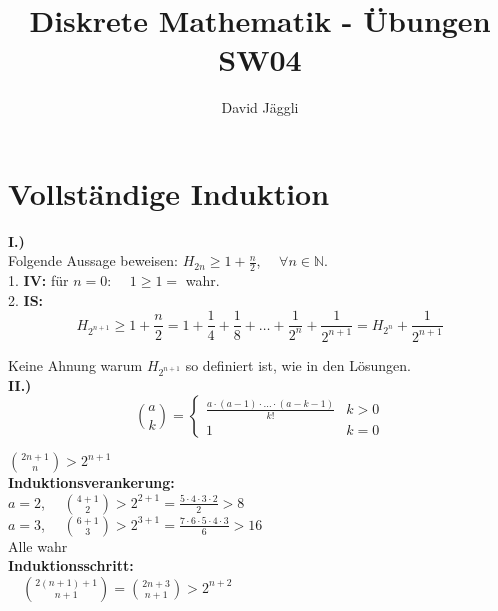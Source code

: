 \documentclass[12pt]{scrartcl}
\author{David Jäggli}
\title{Diskrete Mathematik - Übungen SW04}
\begin{document}
\maketitle

\tableofcontents

\newpage
\section{Vollständige Induktion}
\textbf{I.)}\\
Folgende Aussage beweisen: $H_{2n} \geq 1+\displaystyle{\frac{n}{2}}$, $\quad\forall n \in \mathbb{N}$.\\

1. \textbf{IV:} für $n=0$: $\quad1 \geq 1 = $ wahr.\\
2. \textbf{IS:} \\
\[H_{2^{n+1}} \geq 1 + \frac{n}{2} = 1 + \frac{1}{4} + \frac{1}{8} + \dots + \frac{1}{2^n} + \frac{1}{2^{n+1}} = H_{2^n} + \frac{1}{2^{n+1}}\] 

{\huge \color{red}{$\times$}\par}

Keine Ahnung warum $H_{2^{n+1}}$ so definiert ist, wie in den Lösungen.\\


\textbf{II.)}\\

\[\binom{a}{k} =
\begin{cases}
    \frac{a \cdot (a-1) \cdot \dots \cdot (a-k-1)}{k!} & k>0\\
    1 & k=0
\end{cases}
\]

$\displaystyle{\binom{2n+1}{n} > 2^{n+1}}$\\

\textbf{Induktionsverankerung:}\\

$a=2$, $\quad\displaystyle{\binom{4+1}{2} > 2^{2+1} = \frac{5 \cdot 4 \cdot 3 \cdot 2}{2}} > 8$\\
$a=3$, $\quad\displaystyle{\binom{6+1}{3} > 2^{3+1} = \frac{7 \cdot 6 \cdot 5 \cdot 4 \cdot 3   }{6}} > 16$\\

Alle wahr\\

\textbf{Induktionsschritt:}\\

$\quad\displaystyle{\binom{2(n+1)+1}{n+1} = \binom{2n+3}{n+1} > 2^{n+2}}$\\
\end{document}
